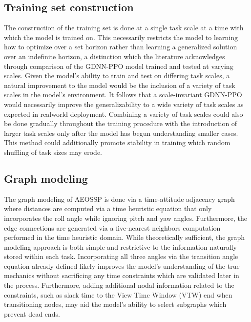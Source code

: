 \documentclass[conf]{new-aiaa}
\begin{document}
\subsection{Training set construction}
The construction of the training set is done at a single task scale at a time with which the model is trained on.
This necessarily restricts the model to learning how to optimize over a set horizon rather than learning a generalized solution over an indefinite horizon, a distinction which the literature acknowledges through comparison of the GDNN-PPO model trained and tested at varying scales.
Given the model’s ability to train and test on differing task scales, a natural improvement to the model would be the inclusion of a variety of task scales in the model’s environment.
It follows that a scale-invariant GDNN-PPO would necessarily improve the generalizability to a wide variety of task scales as expected in realworld deployment.
Combining a variety of task scales could also be done gradually throughout the training procedure with the introduction of larger task scales only after the model has begun understanding smaller cases.
This method could additionally promote stability in training which random shuffling of task sizes may erode.

\subsection{Graph modeling}
The graph modeling of AEOSSP is done via a time-attitude adjacency graph where distances are computed via a time heuristic equation that only incorporates the roll angle while ignoring pitch and yaw angles.
Furthermore, the edge connections are generated via a five-nearest neighbors computation performed in the time heuristic domain.
While theoretically sufficient, the graph modeling approach is both simple and restrictive to the information naturally stored within each task.
Incorporating all three angles via the transition angle equation already defined likely improves the model’s understanding of the true mechanics without sacrificing any time constraints which are validated later in the process.
Furthermore, adding additional nodal information related to the constraints, such as slack time to the View Time Window (VTW) end when transitioning nodes, may aid the model’s ability to select subgraphs which prevent dead ends.
\end{document}
